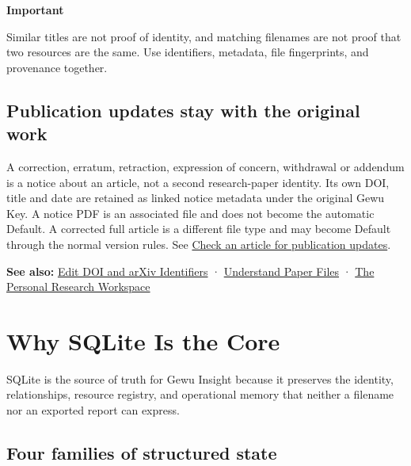 \documentclass[10pt,letterpaper,oneside]{scrreprt}
\newenvironment{GewuRelated}{\par\nobreak\vspace{3pt}\nobreak\begingroup\small\sffamily\begin{samepage}\noindent}{\par\end{samepage}\endgroup}
\newenvironment{GewuLead}
  {\begin{list}{}{\leftmargin=0pt\rightmargin=0pt\topsep=0pt\partopsep=0pt\parsep=0pt}\item\relax
    \sffamily\fontsize{10.5}{13.2}\selectfont\color{GewuMuted}}
  {\end{list}}
\renewenvironment{quote}
  {\Needspace{5\baselineskip}\begin{tcolorbox}[enhanced,breakable,colback=GewuPale,colframe=GewuPale,boxrule=0pt,
    borderline west={1.6pt}{0pt}{GewuBlue},arc=1.2mm,left=2.5mm,right=2.5mm,top=1.7mm,bottom=1.7mm,
    before skip=4pt,after skip=5pt,fontupper=\color{GewuInk}\small]}
  {\end{tcolorbox}}
\begin{document}
\begin{quote}
\textbf{Important}

Similar titles are not proof of identity, and matching filenames are not proof that two resources are the same. Use identifiers, metadata, file fingerprints, and provenance together.
\end{quote}

\section{Publication updates stay with the original work}\label{publication-updates-stay-with-the-original-work}

A correction, erratum, retraction, expression of concern, withdrawal or addendum is a notice about an article, not a second research-paper identity. Its own DOI, title and date are retained as linked notice metadata under the original Gewu Key. A notice PDF is an associated file and does not become the automatic Default. A corrected full article is a different file type and may become Default through the normal version rules. See \hyperref[paper-publication-updates]{Check an article for publication updates}.

\begin{GewuRelated}
\textbf{See also:} \hyperref[identifiers]{Edit DOI and arXiv Identifiers} · \hyperref[paper-files]{Understand Paper Files} · \hyperref[personal-research-workspace]{The Personal Research Workspace}
\end{GewuRelated}

\chapter{Why SQLite Is the Core}\label{sqlite-core}

\begin{GewuLead}
SQLite is the source of truth for Gewu Insight because it preserves the identity, relationships, resource registry, and operational memory that neither a filename nor an exported report can express.
\end{GewuLead}

\section{Four families of structured state}\label{four-families-of-structured-state}
\end{document}
